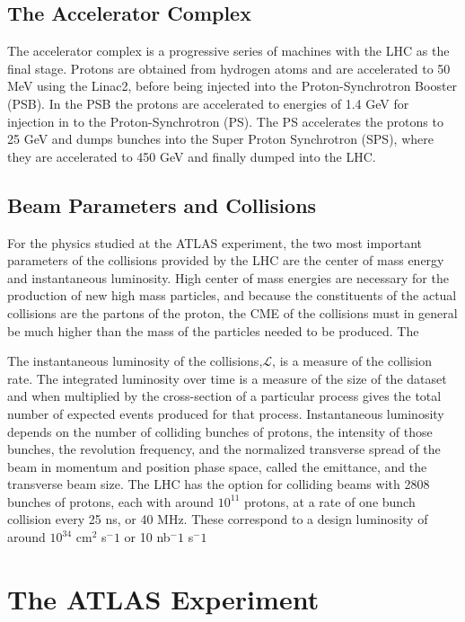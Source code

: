 \subsection{The Accelerator Complex}

The accelerator complex is a progressive series of machines with the LHC as the final stage.
Protons are obtained from hydrogen atoms and are accelerated to 50 MeV using the
Linac2, before being injected into the Proton-Synchrotron Booster (PSB). In
the PSB the protons are accelerated to energies of 1.4 GeV for injection
in to the Proton-Synchrotron (PS). The PS accelerates the protons to 25 GeV
and dumps bunches into the Super Proton Synchrotron (SPS), where they 
are accelerated to 450 GeV and finally dumped into the LHC. 

\subsection{Beam Parameters and Collisions} 

For the physics studied at the ATLAS experiment, the two most important parameters of
the collisions provided by the LHC are the center of mass energy and instantaneous luminosity.
High center of mass energies are necessary for the production
of new high mass particles, and because the constituents of the actual collisions
are the partons of the proton, the CME of the collisions must in general
be much higher than the mass of the particles needed to be produced. The

The instantaneous luminosity of the collisions,$\mathcal{L}$, is a measure of the
collision rate. The integrated luminosity over time is a measure of the size
of the dataset and when multiplied by the cross-section of a particular process
gives the total number of expected events produced for that process.
Instantaneous luminosity depends on the number of colliding bunches of protons,
the intensity of those bunches, the revolution
frequency, and the normalized transverse spread of the beam in momentum and position
phase space, called the emittance, and the transverse beam size. The LHC has the
option for colliding beams with 2808 bunches of protons, each with around $10^11$ protons,
at a rate of one bunch collision every 25 ns, or 40 MHz. These correspond
to a design luminosity of around $10^34$ cm$^{2}$ s$^-1$ or 10 nb$^-1$ s$^-1$
  

\section{The ATLAS Experiment}


